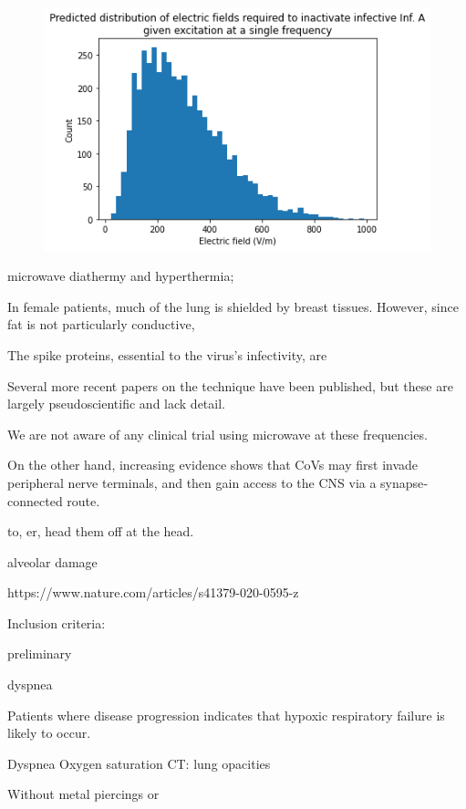 \documentclass[fleqn,10pt]{paper}
\begin{document}
\begin{figure}[H]
	\centering
	\includegraphics[width=\textwidth]{biology/output_35_1.png}
\end{figure}



microwave diathermy and hyperthermia; 

In female patients, much of the lung is shielded by breast tissues. However, since fat is not particularly conductive, 

The spike proteins, essential to the virus's infectivity, are 


Several more recent papers \cite{Theoretical2020} on the technique have been published, but these are largely pseudoscientific and lack detail. 

We are not aware of any clinical trial using microwave at these frequencies.

\cite{neuroinvasive2020}

On the other hand, increasing evidence
shows that CoVs may first invade peripheral nerve terminals, and
then gain access to the CNS via a synapse‐connected route.

to, er, head them off at the head.

alveolar damage

https://www.nature.com/articles/s41379-020-0595-z

Inclusion criteria:

preliminary

dyspnea

Patients where disease progression indicates that hypoxic respiratory failure is likely to occur.

Dyspnea
Oxygen saturation
CT: lung opacities

Without metal piercings or 
\end{document}
